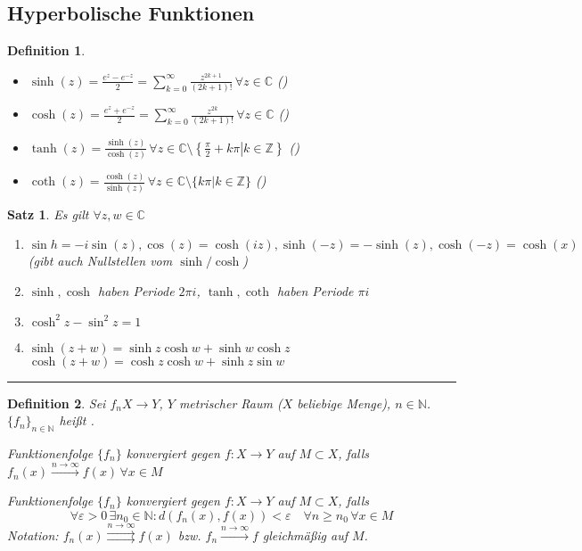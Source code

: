 \documentclass[ngerman,a4paper]{report}
\theoremstyle{break}
\newtheorem{satz}[theorem]{Satz}
\newtheorem*{definition}{Definition}
\renewcommand{\epsilon}{\varepsilon}
\begin{document}
\subsection*{Hyperbolische Funktionen}
\begin{definition}
	\begin{itemize}
		\item $\sinh (z) = \frac{e^z - e^{-z}}{2} = \sum_{k=0}^\infty \frac{z^{2k+1}}{(2k+1)!}\,\forall z\in\mathbb{C}$ ()
		\item $\cosh (z) = \frac{e^z+e^{-z}}{2} = \sum_{k=0}^\infty \frac{z^{2k}}{(2k+1)!}\,\forall z\in\mathbb{C}$ ()
		\item $\tanh (z) = \frac{\sinh (z)}{\cosh (z)}\,\forall z\in\mathbb{C}\setminus\left\lbrace \left.\frac{\pi}{2} + k\pi  \right| k\in\mathbb{Z} \right\rbrace$ ()
		\item $\coth(z) = \frac{\cosh(z)}{\sinh(z)} \,\forall z\in\mathbb{C}\setminus \{ k\pi | k\in\mathbb{Z}\}$ ()
	\end{itemize}
\end{definition}

\begin{satz}
	Es gilt $\forall z,w\in\mathbb{C}$
	\begin{enumerate}[label={\arabic*)}]
		\item $\sin h = -i\sin(z), \cos (z) = \cosh(iz), \sinh(-z) = -\sinh(z), \cosh(-z) = \cosh(x)$ (gibt auch Nullstellen vom $\sinh / \cosh$)
		\item $\sinh, \cosh$ haben Periode $2\pi i$, $\tanh, \coth$ haben Periode $\pi i$
		\item $\cosh^2 z - \sin^2 z = 1$
		\item $\sinh(z+w) = \sinh z \cosh w + \sinh w \cosh z$\\
		$\cosh (z+w) = \cosh z \cosh w + \sinh z \sin w$
	\end{enumerate}
\end{satz}
\rule{4cm}{0.4pt}
\begin{definition}
	Sei $f_n X\to Y$, $Y$ metrischer Raum ($X$ beliebige Menge), $n\in\mathbb{N}$. $\{f_n\}_{n\in\mathbb{N}}$ heißt .
	
	Funktionenfolge $\{f_n\}$ konvergiert  gegen $f:X\to Y$ auf $M\subset X$, falls $f_n(x) \overset{n\rightarrow\infty}{\longrightarrow} f(x) \,\forall x\in M$
	
	Funktionenfolge $\{f_n\}$ konvergiert  gegen $f:X\to Y$ auf $M\subset X$, falls \[ \forall \epsilon > 0 \,\exists n_0\in\mathbb{N}: d(f_n(x), f(x)) < \epsilon\quad \forall n\ge n_0\,\forall x\in M \]
	Notation: \mathsymbol*{->}{$\rightrightarrows$} $f_n(x) \overset{n\rightarrow\infty}{\rightrightarrows} f(x)$ bzw. $f_n\overset{n\rightarrow\infty}{\longrightarrow}f$ gleichmäßig auf $M$.
\end{definition}
\end{document}
